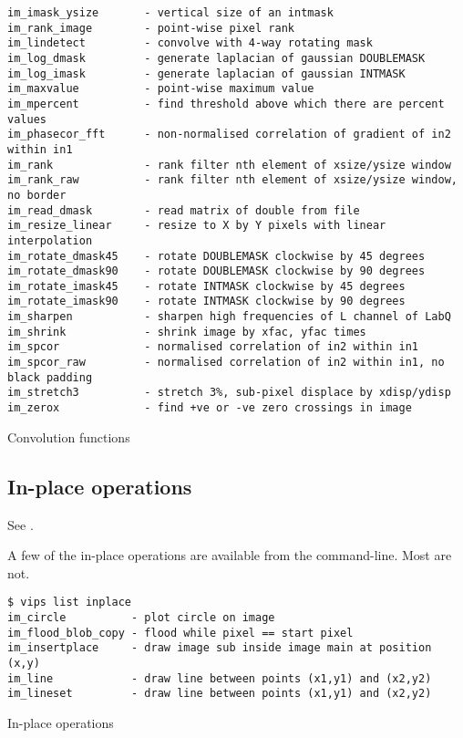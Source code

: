 \begin{fig2}
\begin{verbatim}
im_imask_ysize       - vertical size of an intmask
im_rank_image        - point-wise pixel rank
im_lindetect         - convolve with 4-way rotating mask
im_log_dmask         - generate laplacian of gaussian DOUBLEMASK
im_log_imask         - generate laplacian of gaussian INTMASK
im_maxvalue          - point-wise maximum value
im_mpercent          - find threshold above which there are percent values
im_phasecor_fft      - non-normalised correlation of gradient of in2 within in1
im_rank              - rank filter nth element of xsize/ysize window
im_rank_raw          - rank filter nth element of xsize/ysize window, no border
im_read_dmask        - read matrix of double from file
im_resize_linear     - resize to X by Y pixels with linear interpolation
im_rotate_dmask45    - rotate DOUBLEMASK clockwise by 45 degrees
im_rotate_dmask90    - rotate DOUBLEMASK clockwise by 90 degrees
im_rotate_imask45    - rotate INTMASK clockwise by 45 degrees
im_rotate_imask90    - rotate INTMASK clockwise by 90 degrees
im_sharpen           - sharpen high frequencies of L channel of LabQ
im_shrink            - shrink image by xfac, yfac times
im_spcor             - normalised correlation of in2 within in1
im_spcor_raw         - normalised correlation of in2 within in1, no black padding
im_stretch3          - stretch 3%, sub-pixel displace by xdisp/ydisp
im_zerox             - find +ve or -ve zero crossings in image
\end{verbatim}
\caption{Convolution functions}
\label{fg:convolution}
\end{fig2}

\subsection{In-place operations}
\label{sec:inplace}

See .

A few of the in-place operations are available from the command-line. Most are
not. 

\begin{fig2}
\begin{verbatim}
$ vips list inplace
im_circle          - plot circle on image
im_flood_blob_copy - flood while pixel == start pixel
im_insertplace     - draw image sub inside image main at position (x,y)
im_line            - draw line between points (x1,y1) and (x2,y2)
im_lineset         - draw line between points (x1,y1) and (x2,y2)
\end{verbatim}
\caption{In-place operations}
\label{fg:inplace}
\end{fig2}

